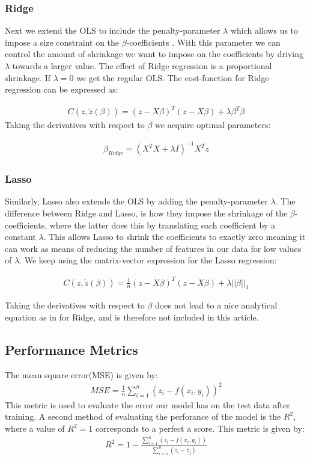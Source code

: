 \documentclass[aps,rmp,reprint,amsmath,amssymb,graphicx,longbibliography]{revtex4-1}
\begin{document}
\subsubsection{Ridge}
Next we extend the OLS to include the penalty-parameter $\lambda$ which allows us to impose a size constraint on the $\beta$-coefficients \cite{lectureNotesRidge}. With this parameter we can control the amount of shrinkage we want to impose on the coefficients by driving $\lambda$ towards a larger value. The effect of Ridge regression is a proportional shrinkage\cite{Hastie}. If $\lambda=0$ we get the regular OLS. 
The cost-function for Ridge regression can be expressed as:

\begin{align*}
    C(z,\tilde{z}(\beta))={(z-X\beta)^T(z-X\beta)}+\lambda\beta^T\beta
\end{align*}
Taking the derivatives with respect to $\beta$ we acquire optimal parameters:

\begin{align*}
    \beta_{Ridge}=(X^TX+\lambda I)^{-1}X^Tz
\end{align*}

\subsubsection{Lasso}

Similarly, Lasso also extends the OLS by adding the penalty-parameter $\lambda$. The difference between Ridge and Lasso, is how they impose the shrinkage of the $\beta$-coefficients, where the latter does this by translating each coefficient by a constant $\lambda$\cite{Hastie}. This allows Lasso to shrink the coefficients to exactly zero meaning it can work as means of reducing the number of features in our data for low values of $\lambda$.
We keep using the matrix-vector expression for the Lasso regression:

\begin{align*}
     C(z,\tilde{z}(\beta))=\frac{1}{n}{(z-X\beta)^T(z-X\beta)}+\lambda||\beta||_1
\end{align*}

Taking the derivatives with respect to $\beta$ does not lead to a nice analytical equation as in for Ridge, and is therefore not included in this article.

\subsection{Performance Metrics}
The mean square error(MSE) is given by:
\begin{align*}
    MSE=\frac{1}{n}\sum^{n}_{i=1}(z_i-f(x_i,y_i))^2
\end{align*}
This metric is used to evaluate the error our model has on the test data after training.
A second method of evaluating the perforance of the model is the $R^2$, where a value of $R^2=1$ corresponds to a perfect a score. This metric is given by:
\begin{align*}
    R^2=1-\frac{\sum_{i=1}^{n}(z_i-f(x_i,y_i))}{\sum_{i=1}^{n}(z_i-\overline{z}_j)}
\end{align*}
\end{document}
